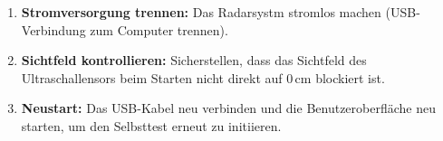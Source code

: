 \begin{enumerate}
	\item \textbf{Stromversorgung trennen:} Das Radarsystm stromlos machen (USB-Verbindung zum Computer trennen).
	\item \textbf{Sichtfeld kontrollieren:} Sicherstellen, dass das Sichtfeld des Ultraschallensors beim Starten nicht direkt auf 0\,cm blockiert ist.
	\item \textbf{Neustart:} Das USB-Kabel neu verbinden und die Benutzeroberfläche neu starten, um den Selbsttest erneut zu initiieren.
\end{enumerate}







